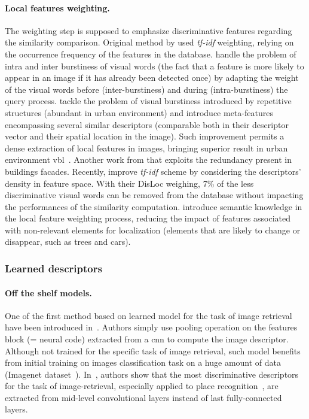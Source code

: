 \paragraph{Local features weighting.} The weighting step is supposed to emphasize discriminative features regarding the similarity comparison.	Original method by \citep{Sivic2003} used \textit{tf-idf} weighting, relying on the occurrence frequency of the features in the database. \citet{Jegou2009} handle the problem of intra and inter burstiness of visual words (\ie the fact that a feature is more likely to appear in an image if it has already been detected once) by adapting the weight of the visual words before (inter-burstiness) and during (intra-burstiness) the query process. \citet{Torii2013} tackle the problem of visual burstiness introduced by repetitive structures (abundant in urban environment) and introduce meta-features encompassing several similar descriptors (comparable both in their descriptor vector and their spatial location in the image). Such improvement permits a dense extraction of local features in images, bringing superior result in urban environment \ac{vbl}~\citep{Qu2016,Torii2015}. Another work from \citet{Morago2016} that exploits the redundancy present in buildings facades. Recently, \citet{Arandjelovic2014} improve \textit{tf-idf} scheme by considering the descriptors' density in feature space. With their DisLoc weighing, 7\% of the less discriminative visual words can be removed from the database without impacting the performances of the similarity computation. \citet{Mousavian2015} introduce semantic knowledge in the local feature weighting process, reducing the impact of features associated with non-relevant elements for localization (\ie elements that are likely to change or disappear, such as trees and cars).

\subsubsection{Learned descriptors}
\label{subsec:cnn_as_global_desc}

\paragraph{Off the shelf models.} One of the first method based on learned model for the task of image retrieval have been introduced in~\citep{Babenko2014}. Authors simply use pooling operation on the features block (= neural code) extracted from a \ac{cnn} to compute the image descriptor. Although not trained for the specific task of image retrieval, such model benefits from initial training on images classification task on a huge amount of data (\eg Imagenet dataset~\citep{Deng2009}). In~\citep{Babenko2014,Sunderhauf2015}, authors show that the most discriminative descriptors for the task of image-retrieval, especially applied to place recognition~\citep{Sunderhauf2015}, are extracted from mid-level convolutional layers instead of last fully-connected layers. 

